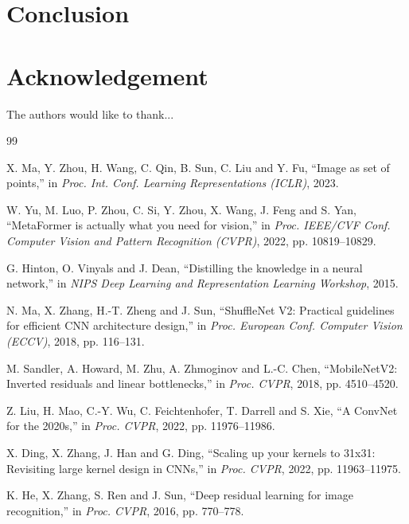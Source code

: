 \documentclass[9pt, conference, a4paper, compsocconf]{IEEEtran}
\begin{document}
\section{Conclusion}
\label{sec:conclusion}

\section*{Acknowledgement}
The authors would like to thank...

\balance
\begin{thebibliography}{99}

 X. Ma, Y. Zhou, H. Wang, C. Qin, B. Sun, C. Liu and Y. Fu,
``Image as set of points,'' in \emph{Proc. Int. Conf. Learning
Representations (ICLR)}, 2023.

 W. Yu, M. Luo, P. Zhou, C. Si, Y. Zhou, X. Wang,
J. Feng and S. Yan, ``MetaFormer is actually what you need for vision,''
in \emph{Proc. IEEE/CVF Conf. Computer Vision and Pattern Recognition
(CVPR)}, 2022, pp. 10819--10829.

 G. Hinton, O. Vinyals and J. Dean, ``Distilling the
knowledge in a neural network,'' in \emph{NIPS Deep Learning and
Representation Learning Workshop}, 2015.

 N. Ma, X. Zhang, H.-T. Zheng and J. Sun,
``ShuffleNet V2: Practical guidelines for efficient CNN architecture
design,'' in \emph{Proc. European Conf. Computer Vision (ECCV)}, 2018,
pp. 116--131.

 M. Sandler, A. Howard, M. Zhu, A. Zhmoginov and
L.-C. Chen, ``MobileNetV2: Inverted residuals and linear bottlenecks,''
in \emph{Proc. CVPR}, 2018, pp. 4510--4520.

 Z. Liu, H. Mao, C.-Y. Wu, C. Feichtenhofer, T. Darrell
and S. Xie, ``A ConvNet for the 2020s,'' in \emph{Proc. CVPR}, 2022,
pp. 11976--11986.

 X. Ding, X. Zhang, J. Han and G. Ding, ``Scaling up your
kernels to 31x31: Revisiting large kernel design in CNNs,'' in
\emph{Proc. CVPR}, 2022, pp. 11963--11975.

 K. He, X. Zhang, S. Ren and J. Sun, ``Deep residual
learning for image recognition,'' in \emph{Proc. CVPR}, 2016, pp. 770--778.


\end{thebibliography}
\end{document}
